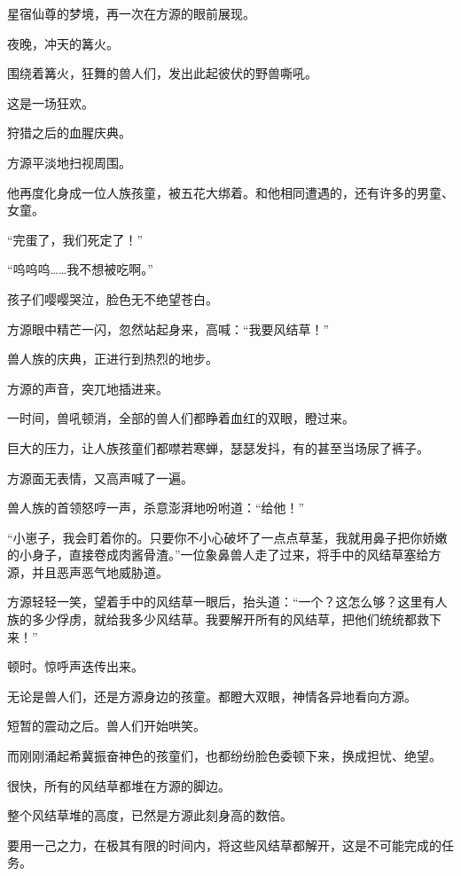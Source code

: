 
\begin{this_body}



星宿仙尊的梦境，再一次在方源的眼前展现。

夜晚，冲天的篝火。

围绕着篝火，狂舞的兽人们，发出此起彼伏的野兽嘶吼。

这是一场狂欢。

狩猎之后的血腥庆典。

方源平淡地扫视周围。

他再度化身成一位人族孩童，被五花大绑着。和他相同遭遇的，还有许多的男童、女童。

“完蛋了，我们死定了！”

“呜呜呜……我不想被吃啊。”

孩子们嘤嘤哭泣，脸色无不绝望苍白。

方源眼中精芒一闪，忽然站起身来，高喊：“我要风结草！”

兽人族的庆典，正进行到热烈的地步。

方源的声音，突兀地插进来。

一时间，兽吼顿消，全部的兽人们都睁着血红的双眼，瞪过来。

巨大的压力，让人族孩童们都噤若寒蝉，瑟瑟发抖，有的甚至当场尿了裤子。

方源面无表情，又高声喊了一遍。

兽人族的首领怒哼一声，杀意澎湃地吩咐道：“给他！”

“小崽子，我会盯着你的。只要你不小心破坏了一点点草茎，我就用鼻子把你娇嫩的小身子，直接卷成肉酱骨渣。”一位象鼻兽人走了过来，将手中的风结草塞给方源，并且恶声恶气地威胁道。

方源轻轻一笑，望着手中的风结草一眼后，抬头道：“一个？这怎么够？这里有人族的多少俘虏，就给我多少风结草。我要解开所有的风结草，把他们统统都救下来！”

顿时。惊呼声迭传出来。

无论是兽人们，还是方源身边的孩童。都瞪大双眼，神情各异地看向方源。

短暂的震动之后。兽人们开始哄笑。

而刚刚涌起希冀振奋神色的孩童们，也都纷纷脸色委顿下来，换成担忧、绝望。

很快，所有的风结草都堆在方源的脚边。

整个风结草堆的高度，已然是方源此刻身高的数倍。

要用一己之力，在极其有限的时间内，将这些风结草都解开，这是不可能完成的任务。


\end{this_body}

